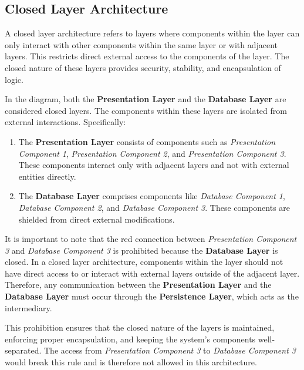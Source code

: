 \subsection{Closed Layer Architecture}

A closed layer architecture refers to layers where components within the layer can only interact with other components within the same layer or with adjacent layers. This restricts direct external access to the components of the layer. The closed nature of these layers provides security, stability, and encapsulation of logic. 

In the diagram, both the \textbf{Presentation Layer} and the \textbf{Database Layer} are considered closed layers. The components within these layers are isolated from external interactions. Specifically:
\begin{enumerate}
	\item The \textbf{Presentation Layer} consists of components such as \textit{Presentation Component 1}, \textit{Presentation Component 2}, and \textit{Presentation Component 3}. These components interact only with adjacent layers and not with external entities directly.
	\item The \textbf{Database Layer} comprises components like \textit{Database Component 1}, \textit{Database Component 2}, and \textit{Database Component 3}. These components are shielded from direct external modifications.
\end{enumerate}

It is important to note that the red connection between \textit{Presentation Component 3} and \textit{Database Component 3} is prohibited because the \textbf{Database Layer} is closed. In a closed layer architecture, components within the layer should not have direct access to or interact with external layers outside of the adjacent layer. Therefore, any communication between the \textbf{Presentation Layer} and the \textbf{Database Layer} must occur through the \textbf{Persistence Layer}, which acts as the intermediary.

This prohibition ensures that the closed nature of the layers is maintained, enforcing proper encapsulation, and keeping the system's components well-separated. The access from \textit{Presentation Component 3} to \textit{Database Component 3} would break this rule and is therefore not allowed in this architecture.

